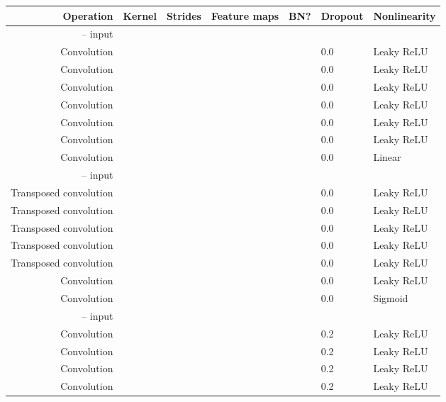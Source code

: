 \documentclass{article}
\begin{document}
\begin{table}[h]
\centering
\begin{tabular}{@{}rllllll@{}} \toprule
Operation              & Kernel       & Strides      & Feature maps & BN?          & Dropout & Nonlinearity \\ \midrule
 --  input                                                                 \\
Convolution            &  &  &          &       & 0.0     & Leaky ReLU \\
Convolution            &  &  &          &       & 0.0     & Leaky ReLU \\
Convolution            &  &  &         &       & 0.0     & Leaky ReLU \\
Convolution            &  &  &         &       & 0.0     & Leaky ReLU \\
Convolution            &  &  &         &       & 0.0     & Leaky ReLU \\
Convolution            &  &  &         &       & 0.0     & Leaky ReLU \\
Convolution            &  &  &         &      & 0.0     & Linear     \\
 --  input                                                                 \\
Transposed convolution &  &  &         &       & 0.0     & Leaky ReLU \\
Transposed convolution &  &  &         &       & 0.0     & Leaky ReLU \\
Transposed convolution &  &  &          &       & 0.0     & Leaky ReLU \\
Transposed convolution &  &  &          &       & 0.0     & Leaky ReLU \\
Transposed convolution &  &  &          &       & 0.0     & Leaky ReLU \\
Convolution            &  &  &          &       & 0.0     & Leaky ReLU \\
Convolution            &  &  &           &      & 0.0     & Sigmoid    \\
 --  input                                                                   \\
Convolution            &  &  &          &      & 0.2     & Leaky ReLU \\
Convolution            &  &  &          &       & 0.2     & Leaky ReLU \\
Convolution            &  &  &         &       & 0.2     & Leaky ReLU \\
Convolution            &  &  &         &       & 0.2     & Leaky ReLU \\

\end{tabular}
\end{table}
\end{document}
